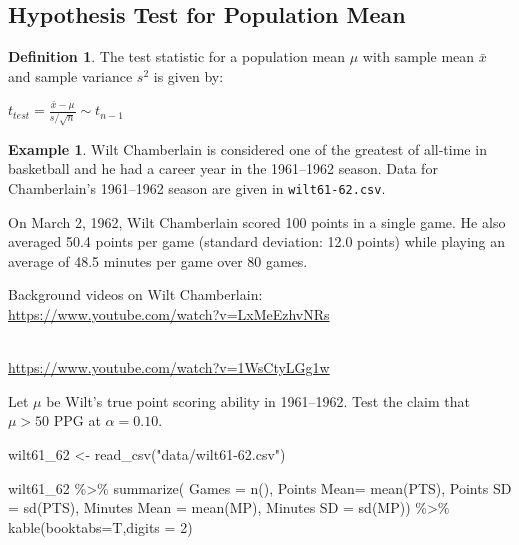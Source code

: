 \documentclass[
  11pt,
]{book}
\newenvironment{Shaded}{\begin{snugshade}}{\end{snugshade}}
\newcommand{\AttributeTok}[1]{\textcolor[rgb]{0.77,0.63,0.00}{#1}}
\newcommand{\DecValTok}[1]{\textcolor[rgb]{0.00,0.00,0.81}{#1}}
\newcommand{\FunctionTok}[1]{\textcolor[rgb]{0.00,0.00,0.00}{#1}}
\newcommand{\NormalTok}[1]{#1}
\newcommand{\OtherTok}[1]{\textcolor[rgb]{0.56,0.35,0.01}{#1}}
\newcommand{\SpecialCharTok}[1]{\textcolor[rgb]{0.00,0.00,0.00}{#1}}
\newcommand{\StringTok}[1]{\textcolor[rgb]{0.31,0.60,0.02}{#1}}
\theoremstyle{definition}
\newtheorem{definition}{Definition}[chapter]
\theoremstyle{definition}
\newtheorem{example}{Example}[chapter]
\theoremstyle{definition}
\theoremstyle{definition}
\theoremstyle{remark}
\begin{document}
\hypertarget{hypothesis-test-for-population-mean}{%
\subsection{Hypothesis Test for Population Mean}\label{hypothesis-test-for-population-mean}}

\begin{definition}
The test statistic for a population mean \(\mu\) with sample mean \(\bar{x}\) and sample variance \(s^2\) is given by:

\(t_{test} = \frac{\bar{x}-\mu}{s/\sqrt{n}} \sim t_{n-1}\)
\end{definition}

\begin{example}
Wilt Chamberlain is considered one of the greatest of all-time in basketball and he had a career year in the 1961--1962 season. Data for Chamberlain's 1961--1962 season are given in \texttt{wilt61-62.csv}.

On March 2, 1962, Wilt Chamberlain scored 100 points in a single game. He also averaged 50.4 points per game (standard deviation: 12.0 points) while playing an average of 48.5 minutes per game over 80 games.

Background videos on Wilt Chamberlain:\\
\url{https://www.youtube.com/watch?v=LxMeEzhvNRs}\strut \\
\url{https://www.youtube.com/watch?v=1WsCtyLGg1w}

Let \(\mu\) be Wilt's true point scoring ability in 1961--1962. Test the claim that \(\mu > 50\) PPG at \(\alpha=0.10\).
\end{example}

\vfill

\newpage

\begin{Shaded}
\begin{Highlighting}[]
\NormalTok{wilt61\_62 }\OtherTok{\textless{}{-}} \FunctionTok{read\_csv}\NormalTok{(}\StringTok{"data/wilt61{-}62.csv"}\NormalTok{)}

\NormalTok{wilt61\_62 }\SpecialCharTok{\%\textgreater{}\%} \FunctionTok{summarize}\NormalTok{(}
  \AttributeTok{Games =} \FunctionTok{n}\NormalTok{(), }
  \StringTok{\textasciigrave{}}\AttributeTok{Points Mean}\StringTok{\textasciigrave{}}\OtherTok{=} \FunctionTok{mean}\NormalTok{(PTS),}
  \StringTok{\textasciigrave{}}\AttributeTok{Points SD}\StringTok{\textasciigrave{}} \OtherTok{=} \FunctionTok{sd}\NormalTok{(PTS),}
  \StringTok{\textasciigrave{}}\AttributeTok{Minutes Mean}\StringTok{\textasciigrave{}} \OtherTok{=} \FunctionTok{mean}\NormalTok{(MP),}
  \StringTok{\textasciigrave{}}\AttributeTok{Minutes SD}\StringTok{\textasciigrave{}} \OtherTok{=} \FunctionTok{sd}\NormalTok{(MP)) }\SpecialCharTok{\%\textgreater{}\%} 
  \FunctionTok{kable}\NormalTok{(}\AttributeTok{booktabs=}\NormalTok{T,}\AttributeTok{digits =} \DecValTok{2}\NormalTok{)}
\end{Highlighting}
\end{Shaded}
\end{document}
